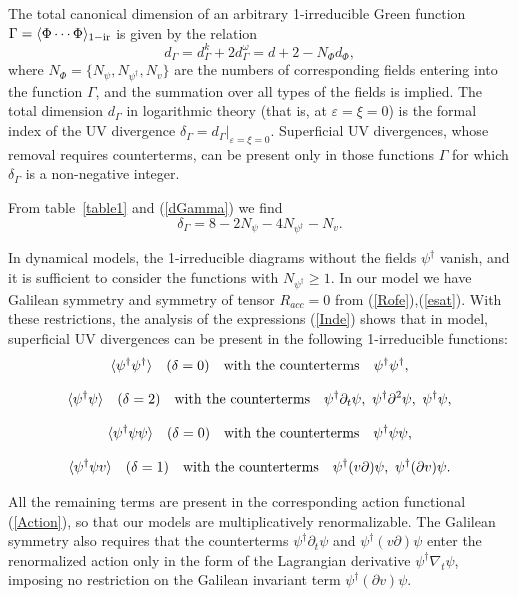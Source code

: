 \documentclass[12pt]{article}
\begin{document}
The total canonical dimension of an arbitrary 1-irreducible Green function
$\Gamma = \langle\Phi \cdots \Phi \rangle _{\rm 1-ir}$
is given by the relation \cite{Book3}
\begin{equation}
d_{\Gamma }=d_{\Gamma }^k+2d_{\Gamma }^{\omega }= d+2-N_{\Phi }d_{\Phi},
\label{dGamma}
\end{equation}
where $N_{\Phi}=\{N_{\psi},N_{\psi^{\dag}}, N_{v}\}$ are the numbers of
corresponding fields entering into the function $\Gamma$, and the summation
over all types of the fields is implied. The total dimension $d_{\Gamma}$
in logarithmic theory (that is, at $\varepsilon=\xi=0$) is the formal index of the
UV divergence $\delta_{\Gamma}=d_{\Gamma}|_{\varepsilon=\xi=0}$. Superficial UV
divergences, whose removal requires counterterms, can be present only in
those functions $\Gamma$ for which $\delta_{\Gamma}$ is a non-negative
integer.

From table~\ref{table1} and (\ref{dGamma}) we find
\begin{equation}
\delta_{\Gamma}= 8 - 2N_{\psi} - 4N_{\psi^{\dag}} - N_{v}.
\label{Inde}
\end{equation}


In dynamical models, the 1-irreducible diagrams without the fields
$\psi^{\dag}$ vanish, and it is sufficient to consider the functions
with $N_{\psi^{\dag}} \ge 1$. In our model we have Galilean symmetry and symmetry of
tensor $R_{acc}=0$ from (\ref{Rofe}),(\ref{esat}). With these restrictions, the analysis of
the expressions (\ref{Inde}) shows that in 
model, superficial UV divergences can be present in the following
1-irreducible functions:
\[ \langle \psi^{\dag} \psi^{\dag} \rangle \quad (\delta=0) \quad
{\rm with\ the\ counterterms} \quad \psi^{\dag}\psi^{\dag}, \]

\[ \langle \psi^{\dag} \psi \rangle \quad (\delta=2) \quad
{\rm with\ the\ counterterms} \quad \psi^{\dag}\partial_{t}\psi, \
\psi^{\dag}\partial^{2}\psi, \ \psi^{\dag}\psi, \]

\[ \langle \psi^{\dag} \psi \psi \rangle \quad (\delta=0) \quad
{\rm with\ the\ counterterms} \quad \psi^{\dag} \psi \psi, \]

\[ \langle \psi^{\dag} \psi v \rangle \quad (\delta=1) \quad
{\rm with\ the\ counterterms} \quad \psi^{\dag} (v\partial) \psi, \
\psi^{\dag} (\partial v) \psi.  \]


All the remaining terms are present in the corresponding action functional
(\ref{Action}), so that our models are multiplicatively
renormalizable. 
The Galilean symmetry also requires that the counterterms
$\psi^{\dag}\partial_{t}\psi$ and $\psi^{\dag} (v\partial) \psi $
enter the renormalized action only in the form of the Lagrangian
derivative $\psi^{\dag}\nabla_{t}\psi$, imposing no restriction on
the Galilean invariant term $\psi^{\dag} (\partial v) \psi $.
\end{document}
